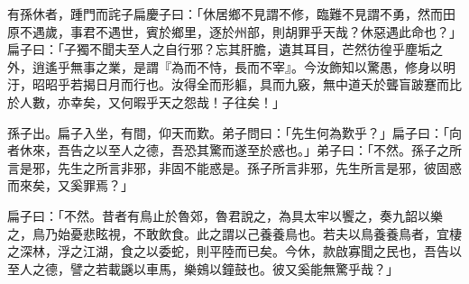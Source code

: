 \begin{pinyinscope}
有孫休者，踵門而詫子扁慶子曰：「休居鄉不見謂不修，臨難不見謂不勇，然而田原不遇歲，事君不遇世，賓於鄉里，逐於州部，則胡罪乎天哉？休惡遇此命也？」扁子曰：「子獨不聞夫至人之自行邪？忘其肝膽，遺其耳目，芒然彷徨乎塵垢之外，逍遙乎無事之業，是謂『為而不恃，長而不宰』。今汝飾知以驚愚，修身以明汙，昭昭乎若揭日月而行也。汝得全而形軀，具而九竅，無中道夭於聾盲跛蹇而比於人數，亦幸矣，又何暇乎天之怨哉！子往矣！」

孫子出。扁子入坐，有間，仰天而歎。弟子問曰：「先生何為歎乎？」扁子曰：「向者休來，吾告之以至人之德，吾恐其驚而遂至於惑也。」弟子曰：「不然。孫子之所言是邪，先生之所言非邪，非固不能惑是。孫子所言非邪，先生所言是邪，彼固惑而來矣，又奚罪焉？」

扁子曰：「不然。昔者有鳥止於魯郊，魯君說之，為具太牢以饗之，奏九韶以樂之，鳥乃始憂悲眩視，不敢飲食。此之謂以己養養鳥也。若夫以鳥養養鳥者，宜棲之深林，浮之江湖，食之以委蛇，則平陸而已矣。今休，款啟寡聞之民也，吾告以至人之德，譬之若載鼷以車馬，樂鴳以鐘鼓也。彼又奚能無驚乎哉？」


\end{pinyinscope}
